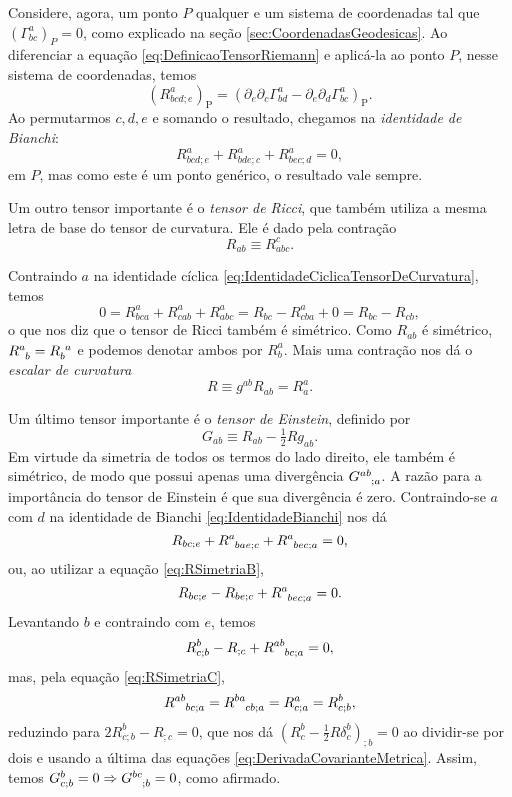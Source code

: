 Considere, agora, um ponto $P$ qualquer e um sistema de coordenadas tal que $(\Gamma^{a}_{bc})_P=0$, como explicado na seção \ref{sec:CoordenadasGeodesicas}. Ao diferenciar a equação \eqref{eq:DefinicaoTensorRiemann} e aplicá-la ao ponto $P$, nesse sistema de coordenadas, temos
\[
	\left(R_{b c d ; e}^{a}\right)_{\mathrm{P}}=\left(\partial_{e} \partial_{c} \Gamma_{b d}^{a}-\partial_{e} \partial_{d} \Gamma_{b c}^{a}\right)_{\mathrm{P}} .
\]
Ao permutarmos $c,d,e$ e somando o resultado, chegamos na \textit{identidade de Bianchi}:
\begin{equation}\label{eq:IdentidadeBianchi}
	R_{b c d ; e}^{a}+R_{b d e ; c}^{a}+R_{b e c ; d}^{a}=0,
\end{equation}
em $P$, mas como este é um ponto genérico, o resultado vale sempre.

Um outro tensor importante é o \textit{tensor de Ricci}, que também utiliza a mesma letra de base do tensor de curvatura. Ele é dado pela contração 
\begin{equation}\label{eq:TensorRicciDefinicao}
	\boxed{
	R_{ab} \equiv R^c_{abc} .
	}
\end{equation}

Contraindo $a$ na identidade cíclica \eqref{eq:IdentidadeCiclicaTensorDeCurvatura}, temos
\[
	0=R_{b c a}^{a}+R_{c a b}^{a}+R_{a b c}^{a}=R_{b c}-R_{c b a}^{a}+0=R_{b c}-R_{c b},
\]
o que nos diz que o tensor de Ricci também é simétrico. Como $R_{ab}$ é simétrico, $\tensor{R}{^a _b}=\tensor{R}{_b ^a}$ e podemos denotar ambos por $R^a_b$. Mais uma contração nos dá o \textit{escalar de curvatura}
\begin{equation}\label{eq:EscalarCurvaturaDefinicao}
	\boxed{
		R \equiv g^{ab}R_{ab}=R^a_a.
	}
\end{equation}

Um último tensor importante é o \textit{tensor de Einstein}, definido por
\begin{equation}\label{eq:TensorEinstein}
	\boxed{
		G_{ab} \equiv R_{ab} - \tfrac{1}{2}Rg_{ab} .
	}
\end{equation}
Em virtude da simetria de todos os termos do lado direito, ele também é simétrico, de modo que possui apenas uma divergência $\tensor{G}{^a^b_{;a}}$. A razão para a importância do tensor de Einstein é que sua divergência é zero. Contraindo-se $a$ com $d$ na identidade de Bianchi \eqref{eq:IdentidadeBianchi} nos dá
\[
	R_{bc;e}+\tensor{R}{^a_{bae;c}}+\tensor{R}{^a_{bec;a}}=0 ,
\]
ou, ao utilizar a equação \eqref{eq:RSimetriaB},
\[
	R_{bc;e}-R_{be;c} + \tensor{R}{^a_{bec;a}} = 0.
\]
Levantando $b$ e contraindo com $e$, temos
\[
	R^b_{c;b}-R_{;c}+\tensor{R}{^a^b_{bc;a}}=0,
\]
mas, pela equação \eqref{eq:RSimetriaC},
\[
	\tensor{R}{^a^b_{bc;a}}=\tensor{R}{^b^a_{cb;a}}=R^a_{c;a}=R^b_{c;b},
\]
reduzindo para $2R^b_{c;b}-R_{;c}=0$, que nos dá $(R^b_c-\tfrac{1}{2}R\delta^b_c)_{;b}=0$ ao dividir-se por dois e usando a última das equações \eqref{eq:DerivadaCovarianteMetrica}. Assim, temos $G^b_{c;b}=0\Rightarrow \tensor{G}{^b^c_{;b}}=0$, como afirmado.

